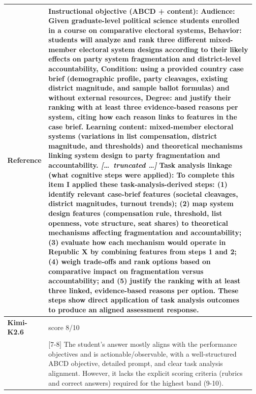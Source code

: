 \begin{longtable}{@{}l p{12.5cm}@{}}
  \textbf{Reference} & Instructional objective (ABCD + content): \newline Audience: Given graduate-level political science students enrolled in a course on comparative electoral systems, \newline Behavior: students will analyze and rank three different mixed-member electoral system designs according to their likely effects on party system fragmentation and district-level accountability, \newline Condition: using a provided country case brief (demographic profile, party cleavages, existing district magnitude, and sample ballot formulas) and without external resources, \newline Degree: and justify their ranking with at least three evidence-based reasons per system, citing how each reason links to features in the case brief. \newline Learning content: mixed-member electoral systems (variations in list compensation, district magnitude, and thresholds) and theoretical mechanisms linking system design to party fragmentation and accountability. \newline \textit{[\ldots\ truncated \ldots]} \newline Task analysis linkage (what cognitive steps were applied): \newline To complete this item I applied these task-analysis-derived steps: (1) identify relevant case-brief features (societal cleavages, district magnitudes, turnout trends); (2) map system design features (compensation rule, threshold, list openness, vote structure, seat shares) to theoretical mechanisms affecting fragmentation and accountability; (3) evaluate how each mechanism would operate in Republic X by combining features from steps 1 and 2; (4) weigh trade-offs and rank options based on comparative impact on fragmentation versus accountability; and (5) justify the ranking with at least three linked, evidence-based reasons per option. These steps show direct application of task analysis outcomes to produce an aligned assessment response. \\
  \midrule
  \textbf{Kimi-K2.6} & score 8/10 \\
  & [7-8] The student's answer mostly aligns with the performance objectives and is actionable/observable, with a well-structured ABCD objective, detailed prompt, and clear task analysis alignment. However, it lacks the explicit scoring criteria (rubrics and correct answers) required for the highest band (9-10). \\

\end{longtable}
